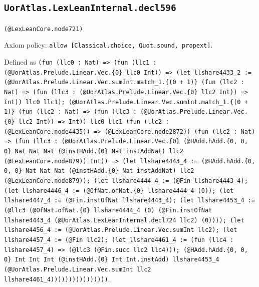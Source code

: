 \documentclass[11pt]{article}
\begin{document}
\subsection*{\texttt{UorAtlas.LexLeanInternal.decl596}}
\noindent\texttt{(@LexLeanCore.node721)}\par
\noindent Axiom policy: \texttt{allow [Classical.choice, Quot.sound, propext]}.\par
\noindent Defined as \texttt{(fun (llc0 : Nat) => (fun (llc1 : (@UorAtlas.Prelude.Linear.Vec.\{0\} llc0 Int)) => (let llshare4433\_2 := (@UorAtlas.Prelude.Linear.Vec.sumInt.match\_1.\{(0 + 1)\} (fun (llc2 : Nat) => (fun (llc3 : (@UorAtlas.Prelude.Linear.Vec.\{0\} llc2 Int)) => Int)) llc0 llc1); (@UorAtlas.Prelude.Linear.Vec.sumInt.match\_1.\{(0 + 1)\} (fun (llc2 : Nat) => (fun (llc3 : (@UorAtlas.Prelude.Linear.Vec.\{0\} llc2 Int)) => Int)) llc0 llc1 (fun (llc2 : (@LexLeanCore.node4435)) => (@LexLeanCore.node2872)) (fun (llc2 : Nat) => (fun (llc3 : (@UorAtlas.Prelude.Linear.Vec.\{0\} (@HAdd.hAdd.\{0, 0, 0\} Nat Nat Nat (@instHAdd.\{0\} Nat instAddNat) llc2 (@LexLeanCore.node879)) Int)) => (let llshare4443\_4 := (@HAdd.hAdd.\{0, 0, 0\} Nat Nat Nat (@instHAdd.\{0\} Nat instAddNat) llc2 (@LexLeanCore.node879)); (let llshare4444\_4 := (@Fin llshare4443\_4); (let llshare4446\_4 := (@OfNat.ofNat.\{0\} llshare4444\_4 (0)); (let llshare4447\_4 := (@Fin.instOfNat llshare4443\_4); (let llshare4453\_4 := (@llc3 (@OfNat.ofNat.\{0\} llshare4444\_4 (0) (@Fin.instOfNat llshare4443\_4 (@UorAtlas.LexLeanInternal.decl724 llc2) (0)))); (let llshare4456\_4 := (@UorAtlas.Prelude.Linear.Vec.sumInt llc2); (let llshare4457\_4 := (@Fin llc2); (let llshare4461\_4 := (fun (llc4 : llshare4457\_4) => (@llc3 (@Fin.succ llc2 llc4))); (@HAdd.hAdd.\{0, 0, 0\} Int Int Int (@instHAdd.\{0\} Int Int.instAdd) llshare4453\_4 (@UorAtlas.Prelude.Linear.Vec.sumInt llc2 llshare4461\_4))))))))))))))))}.\par
\end{document}
